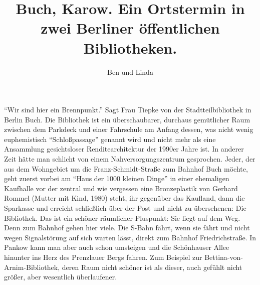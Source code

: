 \documentclass[a4paper,
fontsize=11pt,
oneside,
numbers=noperiodatend,
parskip=half-,
bibliography=totoc,
final
]{scrartcl}
\title{\LARGE{Buch, Karow. Ein Ortstermin in zwei Berliner öffentlichen Bibliotheken.}} %
\author{Ben und Linda} %
\date{}
\begin{document}
\maketitle
\thispagestyle{fancyplain} 


\enquote{Wir sind hier ein Brennpunkt.} Sagt Frau Tiepke von der
Stadtteilbibliothek in Berlin Buch. Die Bibliothek ist ein
überschaubarer, durchaus gemütlicher Raum zwischen dem Parkdeck und
einer Fahrschule am Anfang dessen, was nicht wenig euphemistisch
\enquote{Schloßpassage} genannt wird und nicht mehr als eine Ansammlung
gesichtsloser Renditearchitektur der 1990er Jahre ist. In anderer Zeit
hätte man schlicht von einem Nahversorgungszentrum gesprochen. Jeder,
der aus dem Wohngebiet um die Franz-Schmidt-Straße zum Bahnhof Buch
möchte, geht zuerst vorbei am \enquote{Haus der 1000 kleinen Dinge} in
einer ehemaligen Kaufhalle vor der zentral und wie vergessen eine
Bronzeplastik von Gerhard Rommel (Mutter mit Kind, 1980) steht, ihr
gegenüber das Kaufland, dann die Sparkasse und erreicht schließlich über
der Post und nicht zu übersehenen: Die Bibliothek. Das ist ein schöner
räumlicher Pluspunkt: Sie liegt auf dem Weg. Denn zum Bahnhof gehen hier
viele. Die S-Bahn fährt, wenn sie fährt und nicht wegen Signalstörung
auf sich warten lässt, direkt zum Bahnhof Friedrichstraße. In Pankow
kann man aber auch schon umsteigen und die Schönhauser Allee hinunter
ins Herz des Prenzlauer Bergs fahren. Zum Beispiel zur
Bettina-von-Arnim-Bibliothek, deren Raum nicht schöner ist als dieser,
auch gefühlt nicht größer, aber wesentlich überlaufener.
\end{document}
